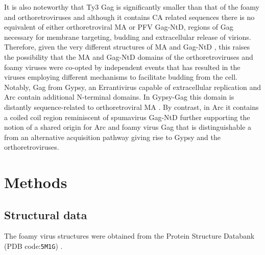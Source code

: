 \documentclass[preprint,12pt]{elsarticle}
\begin{document}
It is also noteworthy that Ty3 Gag is significantly smaller than that of the foamy and orthoretroviruses and
although it contains CA related sequences there is no equivalent of either orthoretroviral MA or PFV Gag-NtD,
regions of Gag necessary for membrane targeting, budding and extracellular release of virions. Therefore, given
the very different structures of MA \cite{HillCPet96,PrchalJet12,RaoZet95,RiffelNet02} and Gag-NtD
\cite{GoldstoneDCet13}, this raises the possibility that the MA and Gag-NtD domains of the orthoretroviruses 
and foamy viruses were co-opted by independent events that has resulted in the viruses employing different 
mechanisms to facilitate budding from the cell. Notably, Gag from Gypsy, an Errantivirus capable of extracellular 
replication \cite{SongSUet94} and Arc contain additional N-terminal domains. In Gypsy-Gag this domain is distantly 
sequence-related to orthoretroviral MA \cite{CampillosMet06}. By contrast, in Arc it contains a coiled coil region
\cite{ZhangWet15} reminiscent of spumavirus Gag-NtD \cite{GoldstoneDCet13,TobalyJet01} further supporting the 
notion of a shared origin for Arc and foamy virus Gag that is distinguishable a from an alternative acquisition 
pathway giving rise to Gypsy and the orthoretroviruses.


\section{Methods}

\subsection{Structural data}

The foamy virus structures were obtained from the Protein Structure Databank
(PDB code:{\tt 5M1G}) \cite{BallNJet16}.
\end{document}
